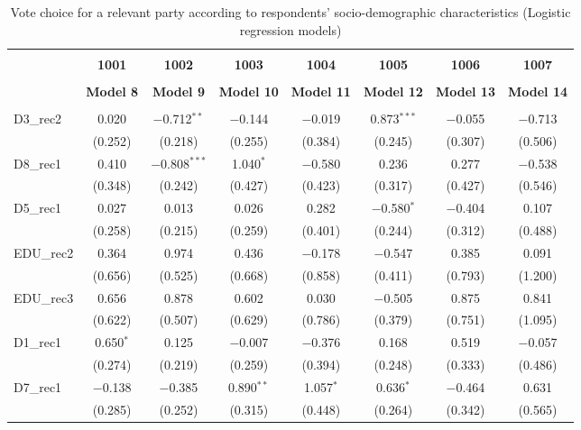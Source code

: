 \documentclass[
]{article}
\begin{document}
\begin{table}[!htbp] \centering 
  \caption{Vote choice for a relevant party according to respondents' 
                       socio-demographic characteristics (Logistic regression models)} 
  \label{table:full_logit_fi} 
\begin{tabular}{@{\extracolsep{5pt}}lccccccc} 
\\[-1.8ex]\hline \\[-1.8ex] 
 & \textbf{1001} & \textbf{1002} & \textbf{1003} & \textbf{1004} & \textbf{1005} & \textbf{1006} & \textbf{1007} \\ 
\\[-1.8ex] & \textbf{Model 8} & \textbf{Model 9} & \textbf{Model 10} & \textbf{Model 11} & \textbf{Model 12} & \textbf{Model 13} & \textbf{Model 14}\\ 
\hline \\[-1.8ex] 
 D3\_rec2 & 0.020 & $-$0.712$^{**}$ & $-$0.144 & $-$0.019 & 0.873$^{***}$ & $-$0.055 & $-$0.713 \\ 
  & (0.252) & (0.218) & (0.255) & (0.384) & (0.245) & (0.307) & (0.506) \\ 
  D8\_rec1 & 0.410 & $-$0.808$^{***}$ & 1.040$^{*}$ & $-$0.580 & 0.236 & 0.277 & $-$0.538 \\ 
  & (0.348) & (0.242) & (0.427) & (0.423) & (0.317) & (0.427) & (0.546) \\ 
  D5\_rec1 & 0.027 & 0.013 & 0.026 & 0.282 & $-$0.580$^{*}$ & $-$0.404 & 0.107 \\ 
  & (0.258) & (0.215) & (0.259) & (0.401) & (0.244) & (0.312) & (0.488) \\ 
  EDU\_rec2 & 0.364 & 0.974 & 0.436 & $-$0.178 & $-$0.547 & 0.385 & 0.091 \\ 
  & (0.656) & (0.525) & (0.668) & (0.858) & (0.411) & (0.793) & (1.200) \\ 
  EDU\_rec3 & 0.656 & 0.878 & 0.602 & 0.030 & $-$0.505 & 0.875 & 0.841 \\ 
  & (0.622) & (0.507) & (0.629) & (0.786) & (0.379) & (0.751) & (1.095) \\ 
  D1\_rec1 & 0.650$^{*}$ & 0.125 & $-$0.007 & $-$0.376 & 0.168 & 0.519 & $-$0.057 \\ 
  & (0.274) & (0.219) & (0.259) & (0.394) & (0.248) & (0.333) & (0.486) \\ 
  D7\_rec1 & $-$0.138 & $-$0.385 & 0.890$^{**}$ & 1.057$^{*}$ & 0.636$^{*}$ & $-$0.464 & 0.631 \\ 
  & (0.285) & (0.252) & (0.315) & (0.448) & (0.264) & (0.342) & (0.565) \\ 

\end{tabular}
\end{table}
\end{document}
